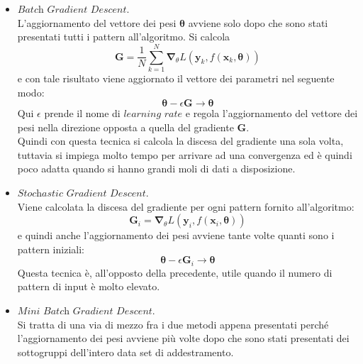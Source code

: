 \begin{itemize}
	\item $\textit{Batch Gradient Descent}$. \\
	 L'aggiornamento del vettore dei pesi $\bm{\theta}$ avviene solo dopo che sono stati presentati tutti i pattern all'algoritmo. Si calcola
	 	\begin{equation}
	 	\textbf{G} = \frac{1}{N} \sum_{k=1}^{N} \boldsymbol{\nabla}_\theta L(\textbf{y}_k,f(\textbf{x}_k,\bm{\theta})) 
	 	\end{equation}
	 e con tale risultato viene aggiornato il vettore dei parametri nel seguente modo: 
	 	\begin{equation}
	 	\bm{\theta} - \epsilon\textbf{G} \rightarrow \bm{\theta}
	 	\end{equation}
	 Qui $\epsilon$ prende il nome di $\textit{learning rate}$ e regola l'aggiornamento del vettore dei pesi nella direzione opposta a quella del gradiente $\textbf{G}$.\\
	 Quindi con questa tecnica si calcola la discesa del gradiente una sola volta, tuttavia si impiega molto tempo per arrivare ad una convergenza ed è quindi poco adatta quando si hanno grandi moli di dati a disposizione. \\
	 
	\item $\textit{Stochastic Gradient Descent}$. \\
	Viene calcolata la discesa del gradiente per ogni pattern fornito all'algoritmo:
	 	\begin{equation}
		\textbf{G}_i =  \boldsymbol{\nabla}_\theta L(\textbf{y}_i,f(\textbf{x}_i,\bm{\theta})) 
		\end{equation}
	e quindi anche l'aggiornamento dei pesi avviene tante volte quanti sono i pattern iniziali:
		\begin{equation}
		\bm{\theta} - \epsilon\textbf{G}_i \rightarrow \bm{\theta}
		\end{equation}
	Questa tecnica è, all'opposto della precedente, utile quando il numero di pattern di input è molto elevato. \\
		
	\item $\textit{Mini Batch Gradient Descent}$. \\
	Si tratta di una via di mezzo fra i due metodi appena presentati perché l'aggiornamento dei pesi avviene più volte dopo che sono stati presentati dei sottogruppi dell'intero data set di addestramento. 
	
\end{itemize}


